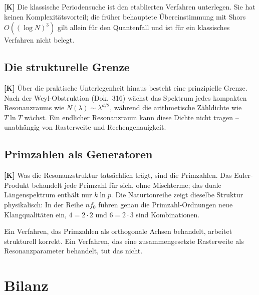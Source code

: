 \textbf{[K]} Die klassische Periodensuche ist den etablierten Verfahren
unterlegen. Sie hat keinen Komplexitätsvorteil; die früher behauptete
Übereinstimmung mit Shors $O((\log N)^3)$ gilt allein für den Quantenfall und
ist für ein klassisches Verfahren nicht belegt.

\subsection{Die strukturelle Grenze}

\textbf{[K]} Über die praktische Unterlegenheit hinaus besteht eine
prinzipielle Grenze. Nach der Weyl-Obstruktion (Dok.~316) wächst das Spektrum
jedes kompakten Resonanzraums wie $N(\lambda) \sim \lambda^{d/2}$, während die
arithmetische Zähldichte wie $T\ln T$ wächst. Ein endlicher Resonanzraum kann
diese Dichte nicht tragen -- unabhängig von Rasterweite und Rechengenauigkeit.

\subsection{Primzahlen als Generatoren}

\textbf{[K]} Was die Resonanzstruktur tatsächlich trägt, sind die Primzahlen.
Das Euler-Produkt behandelt jede Primzahl für sich, ohne Mischterme; das duale
Längenspektrum enthält nur $k \ln p$. Die Naturtonreihe zeigt dieselbe Struktur
physikalisch: In der Reihe $n f_0$ führen genau die Primzahl-Ordnungen neue
Klangqualitäten ein, $4 = 2\cdot2$ und $6 = 2\cdot3$ sind Kombinationen.

Ein Verfahren, das Primzahlen als orthogonale Achsen behandelt, arbeitet
strukturell korrekt. Ein Verfahren, das eine zusammengesetzte Rasterweite als
Resonanzparameter behandelt, tut das nicht.

\section{Bilanz}

